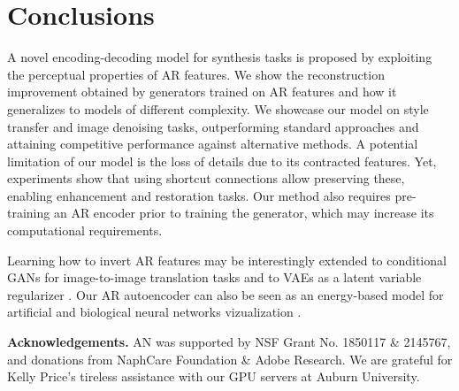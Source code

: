 \section{Conclusions}
\label{sec:conclusions}
A novel encoding-decoding model for synthesis tasks is proposed by exploiting the perceptual properties of AR features. We show the reconstruction improvement obtained by generators trained on AR features and how it generalizes to models of different complexity. We showcase our model on style transfer and image denoising tasks, outperforming standard approaches and attaining competitive performance against alternative methods. A potential limitation of our model is the loss of details due to its contracted features. Yet, experiments show that using shortcut connections allow preserving these, enabling enhancement and restoration tasks. Our method also requires pre-training an AR encoder prior to training the generator, which may increase its computational requirements.

Learning how to invert AR features may be interestingly extended to conditional GANs for image-to-image translation tasks \cite{isola2017image} and to VAEs as a latent variable regularizer \cite{dosovitskiy_2016_generating}. Our AR autoencoder can also be seen as an energy-based model \cite{nguyen2017plug} for artificial and biological neural networks vizualization \cite{nguyen2016synthesizing,nguyen2019understanding,ponce2019evolving}.

\vspace{\baselineskip}
{\noindent \textbf{Acknowledgements.}}
AN was supported by NSF Grant No. 1850117 \& 2145767, and donations from NaphCare Foundation \& Adobe Research.
We are grateful for Kelly Price's tireless assistance with our GPU servers at Auburn University.
